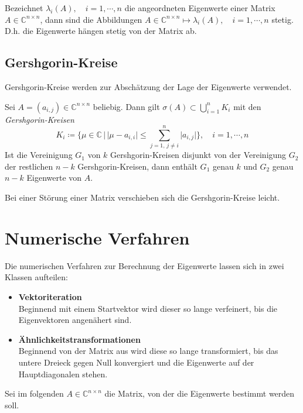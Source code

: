 \documentclass[a4paper, 11pt, accentcolor = tud3b]{tudreport}
\newcommand{\forwhich}{\ensuremath{{\,\vert\,}}}
\newcommand{\abs}[1]{\ensuremath{{\lvert #1 \rvert}}}
\newcommand{\C}{\ensuremath{\mathbb{C}}}
\begin{document}
	        Bezeichnet \( \lambda_i(A), \quad i = 1, \cdots, n \) die angeordneten Eigenwerte einer Matrix \( A \in \C^{n \times n} \), dann sind die Abbildungen \( A \in \C^{n \times n} \mapsto \lambda_i(A), \quad i = 1, \cdots, n \) stetig. D.h. die Eigenwerte hängen stetig von der Matrix ab.
	
		    \subsection{Gershgorin-Kreise}
		        Gershgorin-Kreise werden zur Abschätzung der Lage der Eigenwerte verwendet.
		        
		        Sei \( A = (a_{i,j}) \in \C^{n \times n} \) beliebig. Dann gilt \( \sigma(A) \subset \bigcup_{i=1}^n K_i \) mit den \textit{Gershgorin-Kreisen}
		        \begin{equation*}
			        K_i \coloneqq \bigg\{ \mu \in \C \forwhich \abs{\mu - a_{i,i}} \leq \sum_{j = 1,\, j \neq i}^{n} \abs{a_{i,j}} \bigg\}, \quad i = 1, \cdots, n
		        \end{equation*}
		        Ist die Vereinigung \(G_1\) von \(k\) Gershgorin-Kreisen disjunkt von der Vereinigung \(G_2\) der restlichen \(n-k\) Gershgorin-Kreisen, dann enthält \(G_1\) genau \(k\) und \(G_2\) genau \(n-k\) Eigenwerte von \(A\).
		        
		        Bei einer Störung einer Matrix verschieben sich die Gershgorin-Kreise leicht.
	
	    \section{Numerische Verfahren}
	        Die numerischen Verfahren zur Berechnung der Eigenwerte lassen sich in zwei Klassen aufteilen:
	        \begin{itemize}
	        	\item \textbf{Vektoriteration} \\ Beginnend mit einem Startvektor wird dieser so lange verfeinert, bis die Eigenvektoren angenähert sind.
	        	\item \textbf{Ähnlichkeitstransformationen} \\ Beginnend von der Matrix aus wird diese so lange transformiert, bis das untere Dreieck gegen Null konvergiert und die Eigenwerte auf der Hauptdiagonalen stehen.
	        \end{itemize}
        
	        Sei im folgenden \( A \in \C^{ n \times n } \) die Matrix, von der die Eigenwerte bestimmt werden soll.
	
\end{document}
